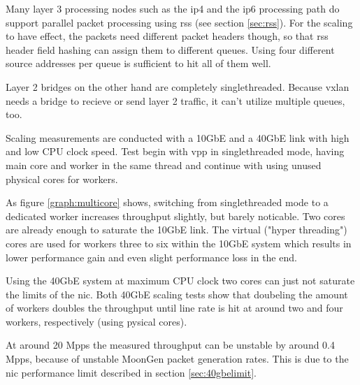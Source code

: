 Many layer 3 processing nodes such as the \Ac{ip4} and the \Ac{ip6}
processing path do support parallel packet processing using \Ac{rss}
(see section \ref{sec:rss}). For the scaling to have effect, the
packets need different packet headers though, so that \Ac{rss} header
field hashing can assign them to different queues. Using four
different source addresses per queue is sufficient to hit all of them
well.

Layer 2 bridges on the other hand are completely singlethreaded.
Because \Ac{vxlan} needs a bridge to recieve or send layer 2 traffic,
it can't utilize multiple queues, too.

Scaling measurements are conducted with a 10GbE and a 40GbE link with
high and low CPU clock speed. Test begin with \Ac{vpp} in
singlethreaded mode, having main core and worker in the same thread
and continue with using unused physical cores for workers.

As figure \ref{graph:multicore} shows, switching from singlethreaded
mode to a dedicated worker increases throughput slightly, but barely
noticable. Two cores are already enough to saturate the 10GbE link.
The virtual ("hyper threading") cores are used for workers three to
six within the 10GbE system which results in lower performance gain
and even slight performance loss in the end.

Using the 40GbE system at maximum CPU clock two cores can just not
saturate the limits of the \Ac{nic}. Both 40GbE scaling tests show
that doubeling the amount of workers doubles the throughput until line
rate is hit at around two and four workers, respectively (using
pysical cores).

At around 20 Mpps the measured throughput can be unstable by around 0.4
Mpps, because of unstable MoonGen packet generation rates. This is
due to the \Ac{nic} performance limit described in section
\ref{sec:40gbelimit}.





